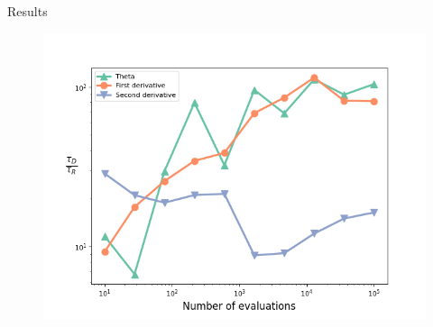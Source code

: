 \documentclass[10pt]{beamer}
\begin{document}
\begin{frame}{Results}
    \begin{figure}[t]
            \includegraphics[width=0.8\columnwidth]{figures/theta.png}
            \label{fig:theta}
    \end{figure}
\end{frame}
\end{document}
